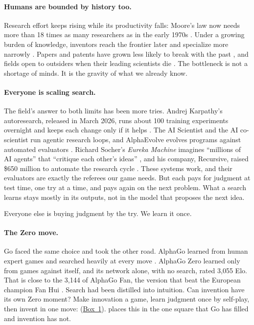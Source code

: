 \paragraph{Humans are bounded by history too.}
Research effort keeps rising while its productivity
falls: Moore's law now needs more than 18 times as many researchers as in the early 1970s \citep{bloom2020ideas}. Under a growing burden
of knowledge, inventors reach the frontier later and specialize more narrowly
\citep{jones2009burden}. Papers and patents have grown less likely to
break with the past \citep{park2023disruptive}, and fields open to outsiders
when their leading scientists die \citep{azoulay2019funeral}. The bottleneck is
not a shortage of minds. It is the gravity of what we already know.

\paragraph{Everyone is scaling search.}
The field's answer to both limits has been more tries. Andrej Karpathy's
autoresearch, released in March 2026, runs about 100 training experiments
overnight and keeps each change only if it helps
\citep{karpathy2026autoresearch}. The AI Scientist \citep{lu2024aiscientist}
and the AI co-scientist \citep{gottweis2025coscientist} run agentic research
loops, and AlphaEvolve evolves programs against automated evaluators
\citep{novikov2025alphaevolve}. Richard Socher's \emph{Eureka Machine} imagines
``millions of AI agents'' that ``critique each other's ideas''
\citep{socher2026bookbite,socher2026eureka}, and his company, Recursive, raised
\$650 million to automate the research cycle \citep{recursive2026techcrunch}.
These systems work, and their evaluators are exactly the referees our game
needs. But each pays for judgment at test time, one try at a time, and pays
again on the next problem. What a search learns stays mostly in its outputs,
not in the model that proposes the next idea.

\begin{keyidea}
Everyone else is buying judgment by the try. We learn it once.
\end{keyidea}

\paragraph{The Zero move.}
Go faced the same choice and took the other road. AlphaGo learned from human
expert games and searched heavily at every move \citep{silver2016mastering}.
AlphaGo Zero learned only from games against itself, and its network alone,
with no search, rated 3,055 Elo. That is close to the 3,144 of AlphaGo Fan, the
version that beat the European champion Fan Hui
\citep{silver2016mastering,silver2017mastering}. Search had been distilled into
intuition. Can invention have its own Zero moment? Make innovation a game,
learn judgment once by self-play, then invent in one move: \searchone{}
(\hyperref[box:searchone]{Box~1}).  places this in the
one square that Go has filled and invention has not.

